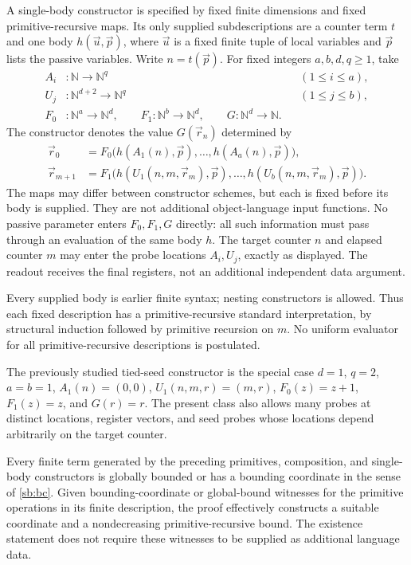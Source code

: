 A single-body constructor is specified by fixed finite dimensions and
fixed primitive-recursive maps.  Its only supplied subdescriptions are a
counter term $t$ and one body $h(\vec u,\vec p)$, where $\vec u$ is a
fixed finite tuple of local variables and $\vec p$ lists the passive
variables.  Write $n=t(\vec p)$.  For fixed integers $a,b,d,q\ge1$, take
\[
 \begin{aligned}
 A_i&:\mathbb N\longrightarrow\mathbb N^q &&(1\le i\le a),\\
 U_j&:\mathbb N^{d+2}\longrightarrow\mathbb N^q &&(1\le j\le b),\\
 F_0&:\mathbb N^a\longrightarrow\mathbb N^d,\qquad
 F_1:\mathbb N^b\longrightarrow\mathbb N^d,\qquad
 G:\mathbb N^d\longrightarrow\mathbb N.
 \end{aligned}
\]
The constructor denotes the value $G(\vec r_n)$ determined by
\begin{align}
 \vec r_0&=F_0\bigl(h(A_1(n),\vec p),\ldots,h(A_a(n),\vec p)\bigr),
 \label{sb:seed}\\
 \vec r_{m+1}&=F_1\bigl(
 h(U_1(n,m,\vec r_m),\vec p),\ldots,
 h(U_b(n,m,\vec r_m),\vec p)\bigr).
 \label{sb:step}
\end{align}
The maps may differ between constructor schemes, but each is fixed before
its body is supplied.  They are not additional object-language input
functions.  No passive parameter enters $F_0,F_1,G$ directly: all such
information must pass through an evaluation of the same body $h$.
The target counter $n$ and elapsed counter $m$ may enter the probe locations
$A_i,U_j$, exactly as displayed.  The readout receives the final registers,
not an additional independent data argument.

Every supplied body is earlier finite syntax; nesting constructors is
allowed.  Thus each fixed description has a primitive-recursive standard
interpretation, by structural induction followed by primitive recursion on
$m$.  No uniform evaluator for all primitive-recursive descriptions is
postulated.

The previously studied tied-seed constructor is the special case
$d=1$, $q=2$, $a=b=1$, $A_1(n)=(0,0)$,
$U_1(n,m,r)=(m,r)$, $F_0(z)=z+1$, $F_1(z)=z$, and $G(r)=r$.
The present class also allows many probes at distinct locations, register
vectors, and seed probes whose locations depend arbitrarily on the target
counter.

\begin{theorem}
\label{thm:single-body-barrier}
Every finite term generated by the preceding primitives, composition, and
single-body constructors is globally bounded or has a bounding coordinate
in the sense of \eqref{sb:bc}. Given bounding-coordinate or global-bound
witnesses for the primitive operations in its finite description, the
proof effectively constructs a suitable coordinate and a nondecreasing
primitive-recursive bound. The existence statement does not require these
witnesses to be supplied as additional language data.
\end{theorem}

